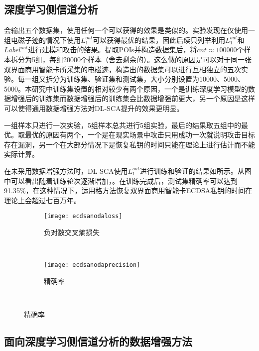 {	\subsection{深度学习侧信道分析}
	会输出五个数据集，使用任何一个可以获得的效果是类似的。实验发现在仅使用一组电磁子迹的情况下使用$L_1^{out}$可以获得最优的结果，因此后续只列举利用$L_1^{out}$和$Label^{out}$进行建模和攻击的结果。提取POIs并构造数据集后，将$cnt\approx100000$个样本拆分为5组，每组20000个样本（舍去剩余的）。这么做的原因是可以对于同一张双界面商用智能卡所采集的电磁迹，构造出的数据集可以进行互相独立的五次实验。每一组又拆分为训练集、验证集和测试集，大小分别设置为10000、5000、5000。本研究中训练集设置的相对较少有两个原因，一个是训练深度学习模型的数据增强后的训练集而数据增强后的训练集会比数据增强前更大，另一个原因是这样可以使得通用数据增强方法对DL-SCA提升的效果更明显。
	
	一组样本只进行一次实验，5组样本总共进行5组实验，最后的结果取五组中的最优。取最优的原因有两个，一个是在现实场景中攻击只用成功一次就说明攻击目标存在漏洞，另一个在大部分情况下是恢复私钥的时间只能在理论上进行估计而不能实际计算。
	
	在未采用数据增强方法时，DL-SCA使用$L_1^{out}$进行训练和验证的结果如所示。从图中可以看出随着训练轮次逐渐增加，。在训练完成后，测试集精确率可以达到91.35\%，在这种情况下，运用格方法恢复双界面商用智能卡ECDSA私钥的时间在理论上会超过七百万年。
	
	\begin{figure}[!h]
		\centering
		\begin{subfigure}[b]{\twof\textwidth}
			\texttt{[image: ecdsanodaloss]}
			\caption{负对数交叉熵损失}
			\label{fig:ecdsanodaloss}
		\end{subfigure}%
		~%
		\begin{subfigure}[b]{\twof\textwidth}
			\texttt{[image: ecdsanodaprecision]}
			\caption{精确率}
			\label{fig:ecdsanodaprecision}
		\end{subfigure}
		\\
		\label{fig:ecdsanoda}
	\end{figure}

	\subsection{面向深度学习侧信道分析的数据增强方法}
	
}
